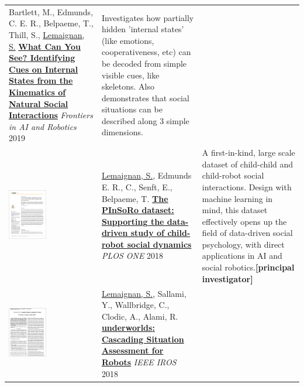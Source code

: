\documentclass[11pt,a4paper]{report}
\begin{document}
\begin{tabular}{p{1.7cm}p{7cm}p{8cm}}
    Bartlett, M., Edmunds, C. E. R., Belpaeme, T., Thill, S., \underline{Lemaignan, S.} 
    \href{https://doi.org/10.3389/frobt.2019.00049}{\textbf{What Can You See? Identifying Cues on Internal States from the
    Kinematics of Natural Social Interactions}} 
    \newline \textit{Frontiers in AI and Robotics} 2019
    & \small Investigates how partially hidden 'internal states' (like emotions,
    cooperativeness, etc) can be decoded from simple visible cues, like
    skeletons. Also demonstrates that social situations can be described along 3
    simple dimensions.\textbf{}\\


    \vspace{-.20cm}\includegraphics[height=2.2cm]{thumbs/2018-plosone.jpg} &

    \underline{Lemaignan, S.}, Edmunds E. R., C., Senft, E., Belpaeme, T.
    \newline\href{https://doi.org/10.1371/journal.pone.0205999}{\textbf{The
    PInSoRo dataset: Supporting the data-driven study of child-robot social
    dynamics}}
    \newline \textit{PLOS ONE} 2018
    & \small A first-in-kind, large scale dataset of child-child and child-robot social interactions. Design
    with machine learning in mind, this dataset effectively opens up the field
    of data-driven social psychology, with direct applications in AI and social
    robotics.\textbf{[principal investigator]}\\

    \vspace{-.20cm}\includegraphics[height=2.2cm]{thumbs/2018-underworlds.jpg} &

    \underline{Lemaignan, S.}, Sallami, Y., Wallbridge, C., Clodic, A., Alami,
    R. 
   \newline\href{https://doi.org/10.1109/IROS.2018.8594094}{\textbf{{\sc
    underworlds}: Cascading Situation Assessment for Robots}}
    \newline\textit{IEEE IROS} 2018


\end{tabular}
\end{document}
